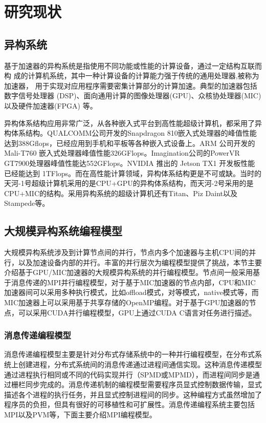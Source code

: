 \section{研究现状}

\subsection{异构系统}
基于加速器的异构系统是指使用不同功能或性能的计算设备，通过一定结构互联而构 成的计算机系统，其中一种计算设备的计算能力强于传统的通用处理器,被称为加速器， 用于实现对应用程序需要密集计算部分的计算加速。典型的加速器包括数字信号处理器 (DSP)、面向通用计算的图像处理器(GPU)、众核协处理器(MIC)以及硬件加速器(FPGA) 等。

异构体系结构应用非常广泛，从各种嵌入式平台到高性能超级计算机，都采用了异构体系结构。QUALCOMM公司开发的Snapdragon 810嵌入式处理器的峰值性能达到388Gflops，已经应用到手机和平板等各种嵌入式设备上。ARM 公司开发的 Mali-T760 嵌入式处理器峰值性能326GFlops。Imagination公司的PowerVR GT7900处理器峰值性能达552GFlops。NVIDIA 推出的 Jetson TX1 开发板性能已经能达到 1TFlops。而在高性能计算领域，异构体系结构更是不可或缺。当时的天河-1号超级计算机采用的是CPU+GPU的异构体系结构，而天河-2号采用的是CPU+MIC的结构。采用异构系统的超级计算机还有Titan、Piz Daint以及Stampede等。

\subsection{ 大规模异构系统编程模型}
大规模异构系统涉及到计算节点间的并行，节点内多个加速器与主机CPU间的并行，以及加速设备内部的并行。丰富的并行层次为编程模型提供了挑战，本节主要介绍基于GPU/MIC加速器的大规模异构系统的并行编程模型。节点间一般采用基于消息传递的MPI并行编程模型，对于基于MIC加速器的节点内部，CPU和MIC加速器间可以采用多种执行模式，比如offload模式，对等模式，native模式等，而MIC加速器上可以采用基于共享存储的OpenMP编程。对于基于GPU加速器的节点，可以采用CUDA并行编程模型，GPU上通过CUDA C语言对任务进行描述。
\subsubsection{消息传递编程模型}
消息传递编程模型主要是针对分布式存储系统中的一种并行编程模型，在分布式系统上创建进程，分布式系统间的消息传递通过进程间通信实现。这种消息传递模型通过进程执行相同或不同的代码实现并行（SPMD或MPMD），而进程间同步是通过栅栏同步完成的。消息传递机制的编程模型需要程序员显式控制数据传输，显式描述各个进程的执行任务，并且显式控制进程间的同步。这种编程方式虽然增加了程序员的负担，但具有很好的可移植性和可扩展性。消息传递编程系统主要包括MPI以及PVM等，下面主要介绍MPI编程模型。

